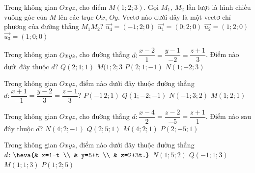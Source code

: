 \begin{ex}%
Trong không gian $Oxyz$, cho điểm $M( 1;2;3 )$. Gọi ${M}_{1}$, ${M}_{2}$ lần lượt là hình chiếu vuông góc của $M$ lên các trục $Ox$, $Oy$. Vectơ nào dưới đây là một vectơ chỉ phương của đường thẳng $M_1M_2$?
\choice
{ \True $\overrightarrow{{{u}_{4}}}=( -1;2;0 )$}
{ $\overrightarrow{{u}_{1}}=( 0;2;0)$}
{  $\overrightarrow {u_2}=( 1;2;0 )$}
{ $\overrightarrow{{{u}_{3}}}=( 1;0;0 )$}
\end{ex}
\begin{ex}%
Trong không gian $Oxyz$, cho đường thẳng $d \colon\dfrac{x-2}{1}=\dfrac{y-1}{-2}=\dfrac{z+1}{3}$. Điểm nào dưới đây thuộc $d$?
	\choice
{ $Q( 2;1;1 )$}
{ $M( 1;2;3 $}
{ \True $P( 2;1;-1)$}
{ $N( 1;-2;3) $}
\end{ex}
\begin{ex}%
Trong không gian $Oxyz$, điểm nào dưới đây thuộc đường thẳng $d \colon \dfrac{x+1}{-1}=\dfrac{y-2}{3}=\dfrac{z-1}{3}$?
\choice
	{\True $P(-1\,2;1)$}
	{ $Q(1;-2;-1)$}
	{ $N(-1;3;2)$}
	{ $M( 1;2;1)$}
\end{ex}
\begin{ex}%
Trong không gian $Oxyz$, cho đường thẳng $d \colon \dfrac{x-4}{2}=\dfrac{z-2}{-5}=\dfrac{z+1}{1}$. Điểm nào sau đây thuộc $d$?
	\choice
	{ \True $N(4;2;-1)$}
	{ $Q(2;5;1)$}
	{ $M(4;2;1)$}
	{ $P(2;-5;1)$}
\end{ex}
\begin{ex}%
Trong không gian $Oxyz$, điểm nào dưới đây thuộc đường thẳng $d \colon 
\heva{& x=1-t \\ 
	& y=5+t \\ 
	& z=2+3t.}$
\choice
	{ \True $N(1;5;2)$}
	{ $Q(-1;1;3)$}
	{ $M(1;1;3)$}
	{ $P(1;2;5)$}
\end{ex}
